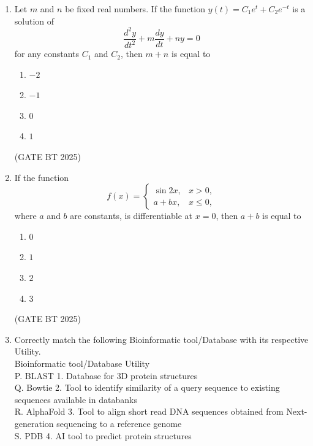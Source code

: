 \documentclass[journal,12pt,onecolumn]{IEEEtran}
\theoremstyle{remark}
\begin{document}
\begin{enumerate}
\item Let $m$ and $n$ be fixed real numbers. If the function $y(t) = C_1 e^t + C_2 e^{-t}$ is a solution of
\[
\frac{d^2 y}{dt^2} + m \frac{dy}{dt} + n y = 0
\]
for any constants $C_1$ and $C_2$, then $m + n$ is equal to
\begin{multicols}{2}
\begin{enumerate}
    \item $-2$
    \item $-1$
    \item $0$
    \item $1$
\end{enumerate}
\end{multicols}
\hfill (GATE BT 2025)

\item If the function
\[
f(x) = 
\begin{cases} 
\sin 2x, & x > 0, \\
a + b x, & x \le 0,
\end{cases}
\]
where $a$ and $b$ are constants, is differentiable at $x = 0$, then $a + b$ is equal to
\begin{multicols}{2}
\begin{enumerate}
    \item $0$
    \item $1$
    \item $2$
    \item $3$
\end{enumerate}
\end{multicols}
\hfill (GATE BT 2025)

\item Correctly match the following Bioinformatic tool/Database with its respective Utility.\\

Bioinformatic tool/Database \hspace{1cm} Utility \\
P. BLAST \hspace{1cm} 1. Database for 3D protein structures \\
Q. Bowtie \hspace{1cm} 2. Tool to identify similarity of a query sequence to existing sequences available in databanks \\
R. AlphaFold \hspace{1cm} 3. Tool to align short read DNA sequences obtained from Next-generation sequencing to a reference genome \\
S. PDB \hspace{1cm} 4. AI tool to predict protein structures


\end{enumerate}
\end{document}
